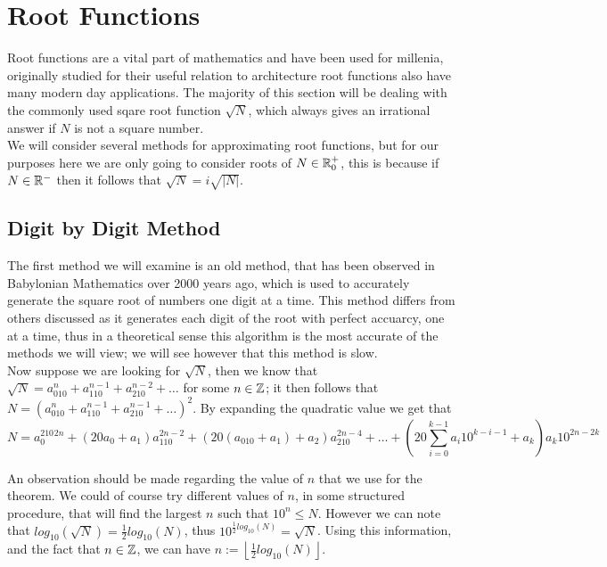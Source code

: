 \section{Root Functions}
\label{SEC_"Root Functions"}

Root functions are a vital part of mathematics and have been used for millenia, originally studied for their useful relation to architecture root functions also have many modern day applications. The majority of this section will be dealing with the commonly used sqare root function \(\sqrt{N}\), which always gives an irrational answer if \(N\) is not a square number.\\

We will consider several methods for approximating root functions, but for our purposes here we are only going to consider roots of \(N \in \mathbb{R}^+_0\), this is because if \(N \in \mathbb{R}^-\) then it follows that \(\sqrt{N} = i\sqrt{|N|}\).

\subsection{Digit by Digit Method}
\label{SUB_"Digit by Digit Method"}

The first method we will examine is an old method, that has been observed in Babylonian Mathematics over 2000 years ago, which is used to accurately generate the square root of numbers one digit at a time. This method differs from others discussed as it generates each digit of the root with perfect accuarcy, one at a time, thus in a theoretical sense this algorithm is the most accurate of the methods we will view; we will see however that this method is slow.\\

Now suppose we are looking for \(\sqrt{N}\), then we know that \(\sqrt{N} = a_010^n + a_110^{n-1} + a_210^{n-2} + \dots\) for some \(n \in \mathbb{Z}\); it then follows that \(N = (a_010^n + a_110^{n-1} + a_210^{n-1} + \dots)^2\). By expanding the quadratic value we get that \[N = a_0^210^{2n} + (20a_0 + a_1)a_110^{2n-2} + (20(a_010 + a_1) + a_2)a_210^{2n-4} + \dots + (20\sum_{i=0}^{k-1}a_i10^{k-i-1} + a_k)a_k10^{2n - 2k}\]

An observation should be made regarding the value of \(n\) that we use for the theorem. We could of course try different values of \(n\), in some structured procedure, that will find the largest \(n\) such that \(10^n \le N\). However we can note that \(log_{10}(\sqrt{N}) = \tfrac{1}{2}log_{10}(N)\), thus \(10^{\frac{1}{2}log_{10}(N)} = \sqrt{N}\). Using this information, and the fact that \(n \in \mathbb{Z}\), we can have \(n := \left\lfloor \tfrac{1}{2}log_{10}(N) \right\rfloor\). \\

